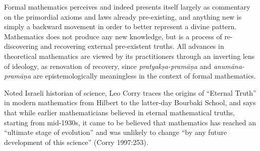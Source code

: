 Formal mathematics perceives and indeed presents itself largely as commentary on the primordial axioms and laws already pre-existing, and anything new is simply a backward movement in order to better represent a divine pattern. Mathematics does not produce any new knowledge, but is a process of re-discovering and recovering external pre-existent truths. All advances in theoretical mathematics are viewed by its practitioners through an inverting lens of ideology, as renovation of recovery, since {\sl pratyakṣa-pramāṇa} and {\sl anumāna-pramāṇa} are epistemologically meaningless in the context of formal mathematics. 

\newpage

Noted Israeli historian of science, Leo Corry traces the origins of ``Eternal Truth'' in modern mathematics from Hilbert to the latter-day Bourbaki School, and says that while earlier mathematicians believed in eternal mathematical truths, starting from mid-1930s, it came to be believed that mathematics has reached an “ultimate stage of evolution” and was unlikely to change “by any future development of this science” (Corry 1997:253).

